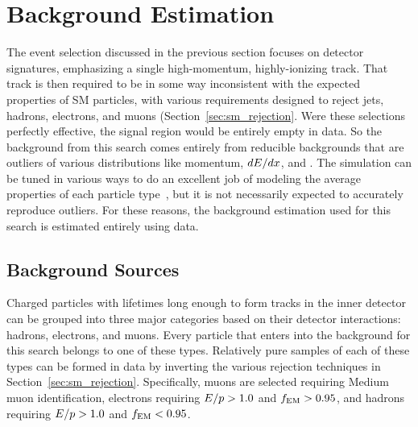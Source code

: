 \chapter{Background Estimation}

\label{ch:background}

The event selection discussed in the previous section focuses on detector signatures, emphasizing a single high-momentum, highly-ionizing track.
That track is then required to be in some way inconsistent with the expected properties of \ac{SM} particles, with various requirements designed to reject jets, hadrons, electrons, and muons (Section~\ref{sec:sm_rejection}.
Were these selections perfectly effective, the signal region would be entirely empty in data.
So the background from this search comes entirely from reducible backgrounds that are outliers of various distributions like momentum, $dE/dx$, and \ptcone.
The simulation can be tuned in various ways to do an excellent job of modeling the average properties of each particle type~\cite{atlas_sim}, but it is not necessarily expected to accurately reproduce outliers.
For these reasons, the background estimation used for this search is estimated entirely using data.





\section{Background Sources}

Charged particles with lifetimes long enough to form tracks in the inner detector can be grouped into three major categories based on their detector interactions: hadrons, electrons, and muons. 
Every particle that enters into the background for this search belongs to one of these types.
Relatively pure samples of each of these types can be formed in data by inverting the various rejection techniques in Section~\ref{sec:sm_rejection}.
Specifically, muons are selected requiring Medium muon identification, electrons requiring $E/p > 1.0$ and $f_\mathrm{EM} > 0.95$, and hadrons requiring $E/p > 1.0$ and $f_\mathrm{EM} < 0.95$. 

